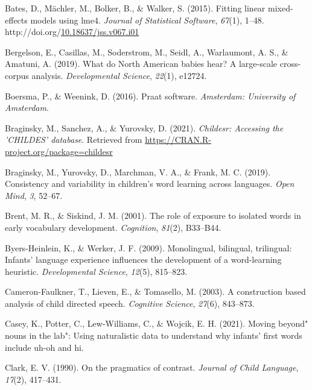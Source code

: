 \documentclass[10pt, letterpaper]{article}
\newenvironment{CSLReferences}%
  {}%
  {\par}
\begin{document}
\hypertarget{refs}{}
\begin{CSLReferences}{1}{0}
\leavevmode\hypertarget{ref-bates2015fitting}{}%
Bates, D., Mächler, M., Bolker, B., \& Walker, S. (2015). Fitting linear
mixed-effects models using {lme4}. \emph{Journal of Statistical
Software}, \emph{67}(1), 1--48.
http://doi.org/\href{https://doi.org/10.18637/jss.v067.i01}{10.18637/jss.v067.i01}

\leavevmode\hypertarget{ref-bergelson2019north}{}%
Bergelson, E., Casillas, M., Soderstrom, M., Seidl, A., Warlaumont, A.
S., \& Amatuni, A. (2019). What do {North American} babies hear? A
large-scale cross-corpus analysis. \emph{Developmental Science},
\emph{22}(1), e12724.

\leavevmode\hypertarget{ref-boersma2016praat}{}%
Boersma, P., \& Weenink, D. (2016). Praat software. \emph{Amsterdam:
University of Amsterdam}.

\leavevmode\hypertarget{ref-braginsky2021childesr}{}%
Braginsky, M., Sanchez, A., \& Yurovsky, D. (2021). \emph{Childesr:
Accessing the 'CHILDES' database}. Retrieved from
\url{https://CRAN.R-project.org/package=childesr}

\leavevmode\hypertarget{ref-braginsky2019consistency}{}%
Braginsky, M., Yurovsky, D., Marchman, V. A., \& Frank, M. C. (2019).
Consistency and variability in children's word learning across
languages. \emph{Open Mind}, \emph{3}, 52--67.

\leavevmode\hypertarget{ref-brent2001role}{}%
Brent, M. R., \& Siskind, J. M. (2001). The role of exposure to isolated
words in early vocabulary development. \emph{Cognition}, \emph{81}(2),
B33--B44.

\leavevmode\hypertarget{ref-byers2009monolingual}{}%
Byers-Heinlein, K., \& Werker, J. F. (2009). Monolingual, bilingual,
trilingual: Infants' language experience influences the development of a
word-learning heuristic. \emph{Developmental Science}, \emph{12}(5),
815--823.

\leavevmode\hypertarget{ref-cameron2003construction}{}%
Cameron-Faulkner, T., Lieven, E., \& Tomasello, M. (2003). A
construction based analysis of child directed speech. \emph{Cognitive
Science}, \emph{27}(6), 843--873.

\leavevmode\hypertarget{ref-caseyURmoving}{}%
Casey, K., Potter, C., Lew-Williams, C., \& Wojcik, E. H. (2021). Moving
beyond" nouns in the lab": Using naturalistic data to understand why
infants' first words include uh-oh and hi.

\leavevmode\hypertarget{ref-clark1990pragmatics}{}%
Clark, E. V. (1990). On the pragmatics of contrast. \emph{Journal of
Child Language}, \emph{17}(2), 417--431.


\end{CSLReferences}
\end{document}
